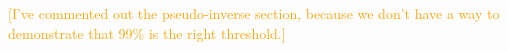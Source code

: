 \documentclass{article}
\newcommand{\comment}[1]{\textcolor{orange}{[#1]}}
\begin{document}
\comment {I've commented out the pseudo-inverse section, because we don't have a way to demonstrate that 99\% is the right threshold.}


\end{document}
